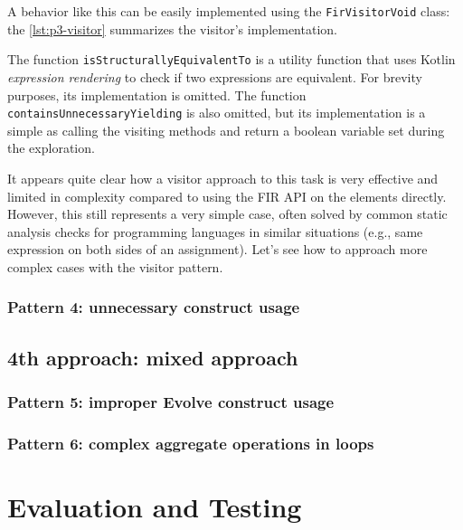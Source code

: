 \documentclass[12pt,a4paper,openright,twoside]{book}
\begin{document}
A behavior like this can be easily implemented using the
\lstinline{FirVisitorVoid} class: the \cref{lst:p3-visitor} summarizes the visitor's
implementation.



The function \lstinline{isStructurallyEquivalentTo} is a utility function that
uses Kotlin \emph{expression rendering} to check if two expressions are 
equivalent. For brevity purposes, its implementation is omitted.
%
The function \lstinline{containsUnnecessaryYielding} is also omitted, but its
implementation is a simple as calling the visiting methods and return a boolean
variable set during the exploration.

It appears quite clear how a visitor approach to this task is very effective and
limited in complexity compared to using the \ac{FIR} API on the elements
directly. However, this still represents a very simple case, often solved by
common static analysis checks for programming languages in similar situations
(e.g., same expression on both sides of an assignment). Let's see how to 
approach more complex cases with the visitor pattern.

\subsection{Pattern 4: unnecessary construct usage}

\section{4th approach: mixed approach}

\subsection{Pattern 5: improper Evolve construct usage}

\subsection{Pattern 6: complex aggregate operations in loops} \label{sec:p6}

\chapter{Evaluation and Testing}
\label{chap:evaluation}
\end{document}
